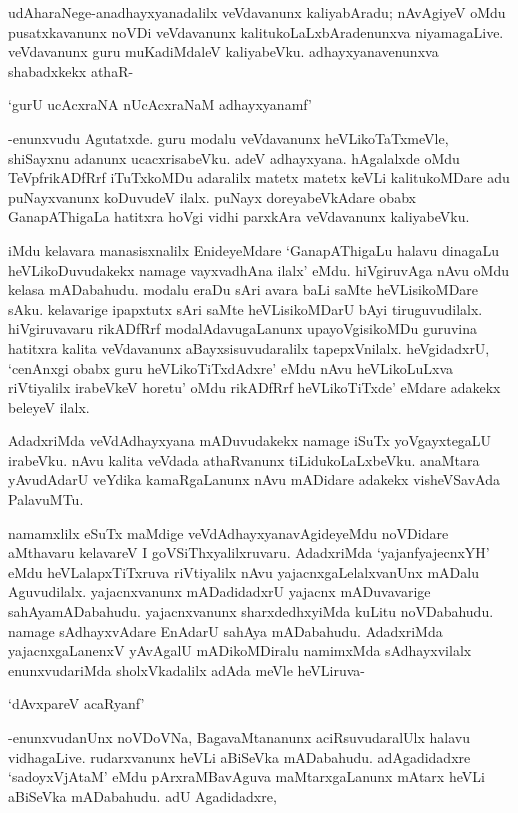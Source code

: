 udAharaNege-anadhayxyanadalilx veVdavanunx kaliyabAradu; nAvAgiyeV oMdu pusatxkavanunx noVDi veVdavanunx kalitukoLaLxbAradenunxva niyamagaLive. veVdavanunx guru muKadiMdaleV kaliyabeVku. adhayxyanavenunxva shabadxkekx athaR- 

\begin{shloka}
`gurU ucAcxraNA nUcAcxraNaM adhayxyanamf'
\end{shloka}

-enunxvudu Agutatxde. guru modalu veVdavanunx heVLikoTaTxmeVle, shiSayxnu adanunx ucacxrisabeVku. adeV adhayxyana. hAgalalxde oMdu TeVpfrikADfRrf iTuTxkoMDu adaralilx matetx matetx keVLi kalitukoMDare adu puNayxvanunx koDuvudeV ilalx. puNayx doreyabeVkAdare obabx GanapAThigaLa hatitxra hoVgi vidhi parxkAra veVdavanunx kaliyabeVku.

iMdu kelavara manasisxnalilx EnideyeMdare `GanapAThigaLu halavu dinagaLu heVLikoDuvudakekx namage vayxvadhAna ilalx' eMdu. hiVgiruvAga nAvu oMdu kelasa mADabahudu. modalu eraDu sAri avara baLi saMte heVLisikoMDare sAku. kelavarige ipapxtutx sAri saMte heVLisikoMDarU bAyi tiruguvudilalx. hiVgiruvavaru rikADfRrf modalAdavugaLanunx upayoVgisikoMDu guruvina hatitxra kalita veVdavanunx aBayxsisuvudaralilx tapepxVnilalx. heVgidadxrU, `cenAnxgi obabx guru heVLikoTiTxdAdxre' eMdu nAvu heVLikoLuLxva riVtiyalilx irabeVkeV horetu' oMdu rikADfRrf heVLikoTiTxde' eMdare adakekx beleyeV ilalx.

AdadxriMda veVdAdhayxyana mADuvudakekx namage iSuTx yoVgayxtegaLU irabeVku. nAvu kalita veVdada athaRvanunx tiLidukoLaLxbeVku. anaMtara yAvudAdarU veYdika kamaRgaLanunx nAvu mADidare adakekx visheVSavAda PalavuMTu.

namamxlilx eSuTx maMdige veVdAdhayxyanavAgideyeMdu noVDidare aMthavaru kelavareV I goVSiThxyalilxruvaru. AdadxriMda `yajanfyajecnxYH' eMdu heVLalapxTiTxruva riVtiyalilx nAvu yajacnxgaLelalxvanUnx mADalu Aguvudilalx. yajacnxvanunx mADadidadxrU yajacnx mADuvavarige sahAyamADabahudu. yajacnxvanunx sharxdedhxyiMda kuLitu noVDabahudu. namage sAdhayxvAdare EnAdarU sahAya mADabahudu. AdadxriMda yajacnxgaLanenxV yAvAgalU mADikoMDiralu namimxMda sAdhayxvilalx enunxvudariMda sholxVkadalilx adAda meVle heVLiruva-

`dAvxpareV acaRyanf'

-enunxvudanUnx noVDoVNa, BagavaMtananunx aciRsuvudaralUlx halavu vidhagaLive. rudarxvanunx heVLi aBiSeVka mADabahudu. adAgadidadxre `sadoyxVjAtaM' eMdu pArxraMBavAguva maMtarxgaLanunx mAtarx heVLi aBiSeVka mADabahudu. adU Agadidadxre,

